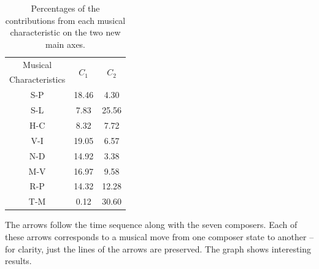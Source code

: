 \documentclass[
 aip,
 jmp,
 amsmath,amssymb,
 reprint,
]{revtex4-1}
\begin{document}
\begin{table}[ht]
\caption{\label{tab:Deviates}Percentages of
the contributions from each musical characteristic on the two
new main axes.}

\begin{tabular}{|c||c|c|}
\hline
Musical         & \multirow{2}{*}{$C_1$} & \multirow{2}{*}{$C_2$} \\
Characteristics & & \\
\hline
 S-P              &  18.46  &   4.30  \\
 S-L              &   7.83  &  25.56  \\
 H-C              &   8.32  &   7.72  \\
 V-I              &  19.05  &   6.57  \\
 N-D              &  14.92  &   3.38  \\
 M-V              &  16.97  &   9.58  \\
 R-P              &  14.32  &  12.28  \\
 T-M              &   0.12  &  30.60  \\
\hline
\end{tabular}
\end{table}

The arrows follow the time sequence along with the seven
composers. Each of these arrows corresponds to a musical move from one
composer state to another -- for clarity, just the lines of the arrows
are preserved. The graph shows interesting results. 
\end{document}
